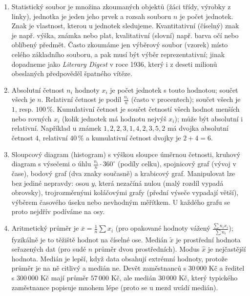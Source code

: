 \begin{enumerate}[label=\textbf{\arabic*.}, leftmargin=*, itemsep=0.8em]
  \item {}
  Statistický soubor je množina zkoumaných objektů (žáci třídy, výrobky z linky), jednotka je jeden jeho prvek a rozsah souboru $n$ je počet jednotek. Znak je vlastnost, kterou u jednotek sledujeme. Kvantitativní (číselný) znak je např. výška, známka nebo plat, kvalitativní (slovní) např. barva očí nebo oblíbený předmět. Často zkoumáme jen výběrový soubor (vzorek) místo celého základního souboru, a pak musí být výběr reprezentativní; jinak dopadneme jako \textit{Literary Digest} v roce 1936, který i z deseti milionů obeslaných předpověděl špatného vítěze. 

  \item {}
  Absolutní četnost $n_i$ hodnoty $x_i$ je počet jednotek s touto hodnotou; součet všech je $n$. Relativní četnost je podíl $\frac{n_i}{n}$ (často v procentech); součet všech je $1$, resp. $100\,\%$. Kumulativní četnost je součet četností všech hodnot menších nebo rovných $x_i$ (kolik jednotek má hodnotu nejvýš $x_i$); může být absolutní i relativní. Například u známek $1, 2, 2, 3, 1, 4, 2, 3, 5, 2$ má dvojka absolutní četnost $4$, relativní $40\,\%$ a kumulativní četnost dvojky je $2 + 4 = 6$.

  \item {}
  Sloupcový diagram (histogram) s výškou sloupce úměrnou četnosti, kruhový diagram s výsečemi o úhlu $\frac{n_i}{n}\cdot 360^\circ$ (podíly celku), spojnicový graf (vývoj v čase), bodový graf (dva znaky současně) a krabicový graf. Manipulovat lze bez jediné nepravdy: osou $y$, která nezačíná nulou (malý rozdíl vypadá obrovsky), trojrozměrnými koláčovými grafy (přední výseče vypadají větší), výběrem časového úseku nebo nevhodným měřítkem. U každého grafu se proto nejdřív podíváme na osy. 

  \item {}
  Aritmetický průměr je $\bar{x} = \frac{1}{n}\sum x_i$ (pro opakované hodnoty vážený $\frac{\sum n_ix_i}{\sum n_i}$); fyzikálně je to těžiště hodnot na číselné ose. Medián $\tilde{x}$ je prostřední hodnota seřazených dat (pro sudé $n$ průměr dvou prostředních). Modus $\hat{x}$ je nejčastější hodnota. Medián je lepší, když data obsahují extrémní hodnoty, protože průměr je na ně citlivý a medián ne. Devět zaměstnanců s $30\,000$ Kč a ředitel s $300\,000$ Kč mají průměr $57\,000$ Kč, ale medián $30\,000$ Kč, který typického zaměstnance popisuje mnohem lépe (proto se u mezd uvádí medián). 


\end{enumerate}
